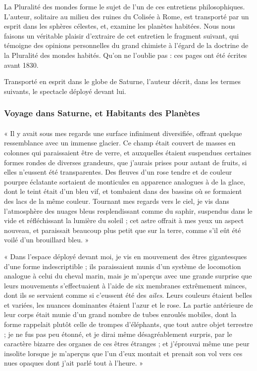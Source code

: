 \documentclass[a4paper, 11pt, oneside, landscape]{article}
\begin{document}
La Pluralité des mondes forme le sujet de l'un de ces entretiens philosophiques. L'auteur, solitaire au milieu des ruines du Colisée à Rome, est transporté par un esprit dans les sphères célestes, et, examine les planètes habitées. Nous nous faisons un véritable plaisir d'extraire de cet entretien le fragment suivant, qui témoigne des opinions personnelles du grand chimiste à l'égard de la doctrine de la Pluralité des mondes habités. Qu'on ne l'oublie pas : ces pages ont été écrites avant 1830.

Transporté en esprit dans le globe de Saturne, l'auteur décrit, dans les termes suivants, le spectacle déployé devant lui.

\subsubsection{Voyage dans Saturne, et Habitants des Planètes}
\paragraph{}
« Il y avait sous mes regards une surface infiniment diversifiée, offrant quelque ressemblance avec un immense glacier. Ce champ était couvert de masses en colonnes qui paraissaient être de verre, et auxquelles étaient suspendues certaines formes rondes de diverses grandeurs, que j'aurais prises pour autant de fruits, si elles n'eussent été transparentes. Des fleuves d'un rose tendre et de couleur pourpre éclatante sortaient de monticules en apparence analogues à de la glace, dont le teint était d'un bleu vif, et tombaient dans des bassins où se formaient des lacs de la même couleur. Tournant mes regards vers le ciel, je vis dans l'atmosphère des nuages bleus resplendissant comme du saphir, suspendus dans le vide et réfléchissant la lumière du soleil ; cet astre offrait à mes yeux un aspect nouveau, et paraissait beaucoup plus petit que sur la terre, comme s'il eût été voilé d'un brouillard bleu. »

« Dans l'espace déployé devant moi, je vis en mouvement des êtres gigantesques d'une forme indescriptible ; ils paraissaient munis d'un système de locomotion analogue à celui du cheval marin, mais je m'aperçus avec une grande surprise que leurs mouvements s'effectuaient à l'aide de six membranes extrêmement minces, dont ils se servaient comme si c'eussent été des \emph{ailes}. Leurs couleurs étaient belles et variées, les nuances dominantes étaient l'azur et le rose. La partie antérieure de leur corps était munie d'un grand nombre de tubes enroulés mobiles, dont la forme rappelait plutôt celle de trompes d'éléphants, que tout autre objet terrestre ; je ne fus pas peu étonné, et je dirai même désagréablement surpris, par le caractère bizarre des organes de ces êtres étranges ; et j'éprouvai même une peur insolite lorsque je m'aperçus que l'un d'eux montait et prenait son vol vers ces nues opaques dont j'ait parlé tout à l'heure. »
\end{document}
